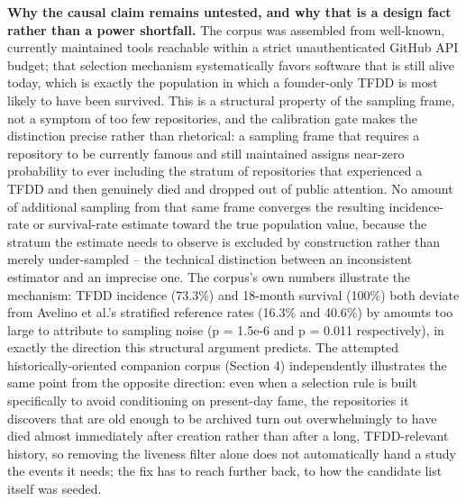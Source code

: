 \documentclass[11pt,letterpaper]{article}
\begin{document}
\textbf{Why the causal claim remains untested, and why that is a design fact rather than a power shortfall.} The corpus was assembled from well-known, currently maintained tools reachable within a strict unauthenticated GitHub API budget; that selection mechanism systematically favors software that is still alive today, which is exactly the population in which a founder-only TFDD is most likely to have been survived. This is a structural property of the sampling frame, not a symptom of too few repositories, and the calibration gate makes the distinction precise rather than rhetorical: a sampling frame that requires a repository to be currently famous and still maintained assigns near-zero probability to ever including the stratum of repositories that experienced a TFDD and then genuinely died and dropped out of public attention. No amount of additional sampling from that same frame converges the resulting incidence-rate or survival-rate estimate toward the true population value, because the stratum the estimate needs to observe is excluded by construction rather than merely under-sampled -- the technical distinction between an inconsistent estimator and an imprecise one. The corpus's own numbers illustrate the mechanism: TFDD incidence (73.3\%) and 18-month survival (100\%) both deviate from Avelino et al.'s stratified reference rates (16.3\% and 40.6\%) by amounts too large to attribute to sampling noise (p = 1.5e-6 and p = 0.011 respectively), in exactly the direction this structural argument predicts. The attempted historically-oriented companion corpus (Section 4) independently illustrates the same point from the opposite direction: even when a selection rule is built specifically to avoid conditioning on present-day fame, the repositories it discovers that are old enough to be archived turn out overwhelmingly to have died almost immediately after creation rather than after a long, TFDD-relevant history, so removing the liveness filter alone does not automatically hand a study the events it needs; the fix has to reach further back, to how the candidate list itself was seeded.
\end{document}
